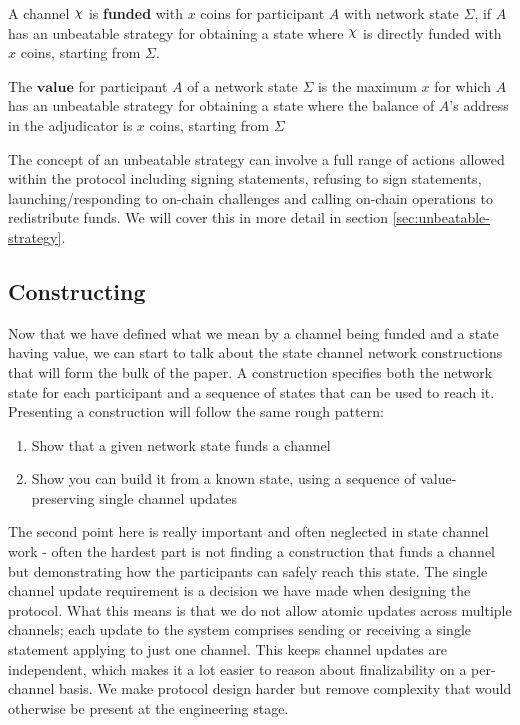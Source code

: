 A channel $\rchi$ is \textbf{funded} with $x$ coins for participant $A$ with network state $\Sigma$, if $A$ has an unbeatable strategy for obtaining a state where $\rchi$ is directly funded with $x$ coins, starting from $\Sigma$.

The $\textbf{value}$ for participant $A$ of a network state $\Sigma$ is the maximum $x$ for which $A$ has an unbeatable strategy for obtaining a state where the balance of $A$'s address in the adjudicator is $x$ coins, starting from $\Sigma$

The concept of an unbeatable strategy can involve a full range of actions allowed within the protocol including signing statements, refusing to sign statements, launching/responding to on-chain challenges and calling on-chain operations to redistribute funds.
We will cover this in more detail in section \ref{sec:unbeatable-strategy}.

\subsection{Constructing}

Now that we have defined what we mean by a channel being funded and a state having value, we can start to talk about the state channel network constructions that will form the bulk of the paper.
A construction specifies both the network state for each participant and a sequence of states that can be used to reach it.
Presenting a construction will follow the same rough pattern:
\begin{enumerate}
  \item Show that a given network state funds a channel
  \item Show you can build it from a known state, using a sequence of value-preserving single channel updates
\end{enumerate}
The second point here is really important and often neglected in state channel work - often the hardest part is not finding a construction that funds a channel but demonstrating how the participants can safely reach this state.
The single channel update requirement is a decision we have made when designing the protocol.
What this means is that we do not allow atomic updates across multiple channels;
each update to the system comprises sending or receiving a single statement applying to just one channel.
This keeps channel updates are independent, which makes it a lot easier to reason about finalizability on a per-channel basis.
We make protocol design harder but remove complexity that would otherwise be present at the engineering stage.

